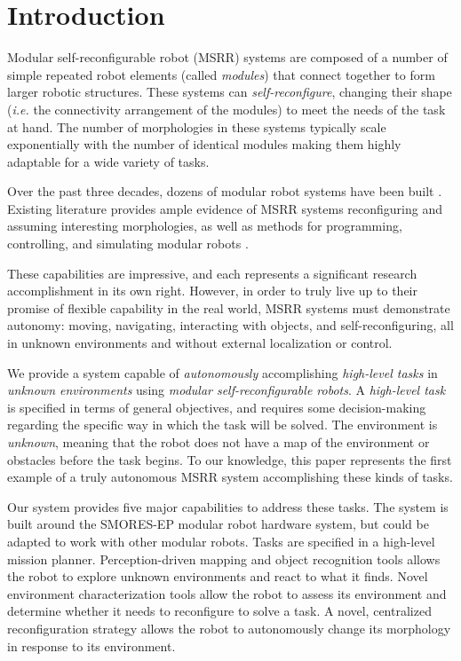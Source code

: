 \documentclass[conference]{IEEEtran}
\begin{document}
\section{Introduction} \label{sec:introduction}
%
Modular self-reconfigurable robot (MSRR) systems are composed of a number of simple repeated robot elements (called \emph{modules}) that connect together to form larger robotic structures. These systems can \emph{self-reconfigure}, changing their shape (\emph{i.e.} the connectivity arrangement of the modules) to meet the needs of the task at hand.
The number of morphologies in these systems typically scale exponentially with the number of identical modules making them highly adaptable for a wide variety of tasks. 

Over the past three decades, dozens of modular robot systems have been built \cite{Yim2007a}. Existing literature provides ample evidence of MSRR systems reconfiguring and assuming interesting morphologies, as well as methods for programming, controlling, and simulating modular robots \cite{Yim2007,Jing2016,Yim1994}.

These capabilities are impressive, and each represents a significant research accomplishment in its own right. However, in order to truly live up to their promise of flexible capability in the real world, MSRR systems must demonstrate autonomy: moving, navigating, interacting with objects, and self-reconfiguring, all in unknown environments and without external localization or control. 

We provide a system capable of \emph{autonomously} accomplishing \emph{high-level
tasks} in \emph{unknown environments} using \emph{modular self-reconfigurable
robots}.  A \emph{high-level task} is specified in terms
of general objectives, and requires some decision-making regarding the specific
way in which the task will be solved. The environment is \emph{unknown}, meaning
that the robot does not have a map of the environment or obstacles before the
task begins. To our knowledge, this paper represents the first example of a truly autonomous MSRR system accomplishing these kinds of tasks.

Our system provides five major capabilities to address these tasks.  The system is built around the SMORES-EP modular robot hardware system, but could be adapted to work with other modular robots. Tasks are specified in a high-level mission planner.  Perception-driven mapping and object recognition tools  allows the robot to explore unknown environments and react to what it finds. Novel environment characterization tools allow the robot to assess its environment and determine whether it needs to reconfigure to solve a task.  A novel, centralized reconfiguration strategy allows the robot to autonomously change its morphology in response to its environment.
\end{document}
